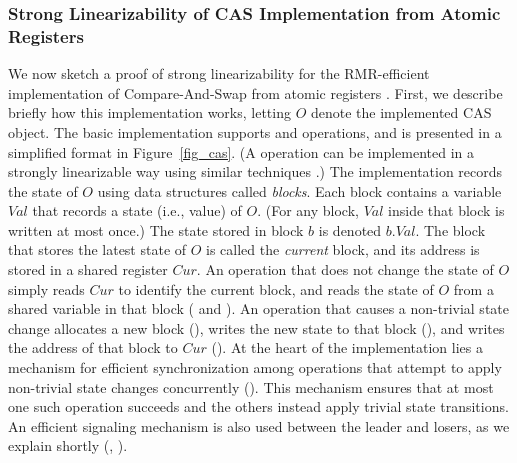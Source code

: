\documentclass[11pt,letterpaper]{article}
\begin{document}
\subsubsection{Strong Linearizability of CAS Implementation from Atomic Registers}

We now sketch a proof of strong linearizability for the RMR-efficient implementation of Compare-And-Swap from atomic registers \cite{ghhw:cas}.
First, we describe briefly how this implementation works, letting $O$ denote the implemented CAS object.
The basic implementation supports \Read and \CAS operations, and is presented in a simplified format in Figure~\ref{fig_cas}.
(A \Write operation can be implemented in a strongly linearizable way using similar techniques \cite{golab:phd}.)
The implementation records the state of $O$ using data structures called \emph{blocks}.
Each block contains a variable $Val$ that records a state (i.e., value) of $O$.
(For any block, $Val$ inside that block is written at most once.)
The state stored in block $b$ is denoted $b.Val$.
The block that stores the latest state of $O$ is called the \emph{current} block,
  and its address is stored in a shared register $Cur$.
An operation that does not change the state of $O$ simply reads $Cur$ to identify the current block,
  and reads the state of $O$ from a shared variable in that block ( and ).
An operation that causes a non-trivial state change allocates a new block (),
  writes the new state to that block (), and writes the address of that block to $Cur$ ().
At the heart of the implementation lies a mechanism for efficient synchronization
  among operations that attempt to apply non-trivial state changes concurrently ().
This mechanism ensures that at most one such operation succeeds
  and the others instead apply trivial state transitions.
An efficient signaling mechanism is also used between the leader and losers, as we explain shortly (, ).
\end{document}
